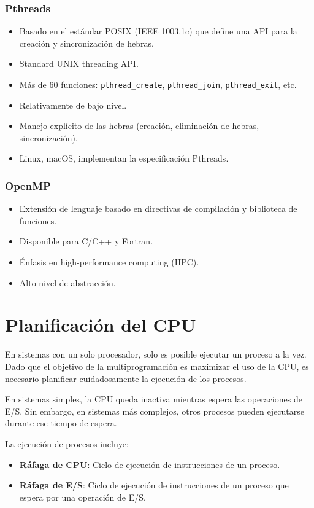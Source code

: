 \documentclass{templateNote}
\begin{document}
\subsubsection*{Pthreads}
\begin{itemize}
    \item Basado en el estándar POSIX (IEEE 1003.1c) que define una API para la creación y sincronización de hebras.
    \item Standard UNIX threading API.
    \item Más de 60 funciones: \texttt{pthread\_create}, \texttt{pthread\_join}, \texttt{pthread\_exit}, etc.
    \item Relativamente de bajo nivel.
    \item Manejo explícito de las hebras (creación, eliminación de hebras, sincronización).
    \item Linux, macOS, implementan la especificación Pthreads.
\end{itemize}

\subsubsection*{OpenMP}
\begin{itemize}
    \item Extensión de lenguaje basado en directivas de compilación y biblioteca de funciones.
    \item Disponible para C/C++ y Fortran.
    \item Énfasis en high-performance computing (HPC).
    \item Alto nivel de abstracción.
\end{itemize}

\newpage
\section{Planificación del CPU}
En sistemas con un solo procesador, solo es posible ejecutar un proceso a la vez. Dado que el objetivo de la multiprogramación es maximizar el uso de la CPU, es necesario planificar cuidadosamente la ejecución de los procesos.

En sistemas simples, la CPU queda inactiva mientras espera las operaciones de E/S. Sin embargo, en sistemas más complejos, otros procesos pueden ejecutarse durante ese tiempo de espera.

La ejecución de procesos incluye:
\begin{itemize}
    \item \textbf{Ráfaga de CPU}: Ciclo de ejecución de instrucciones de un proceso.
    \item \textbf{Ráfaga de E/S}: Ciclo de ejecución de instrucciones de un proceso que espera por una operación de E/S.
\end{itemize}
\end{document}

